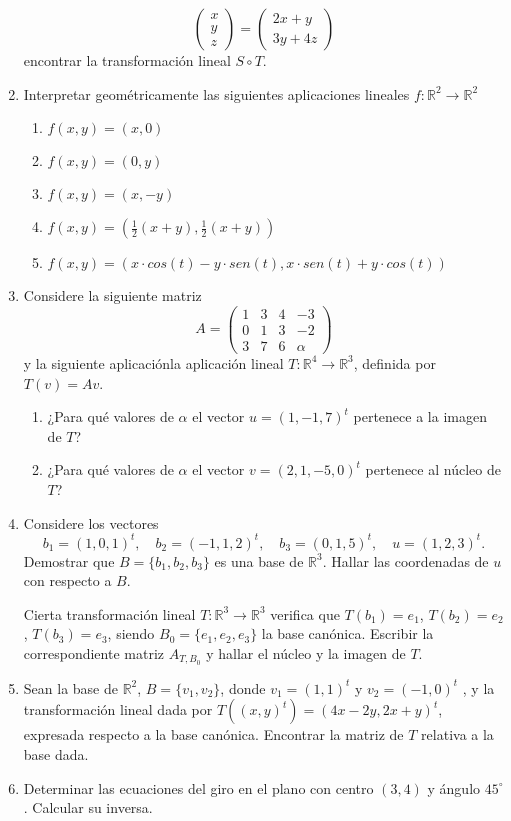 \documentclass[12pt,letterpaper]{article}
\begin{document}
\begin{enumerate}
$$\begin{pmatrix}
    x\\
    y\\
    z
  \end{pmatrix}=\begin{pmatrix}
    2x+y\\
    3y+4z
  \end{pmatrix}
  $$
  encontrar la transformación lineal $S \circ T$.
  \item Interpretar geométricamente las siguientes aplicaciones lineales $f : \mathbb{R}^2 \to \mathbb{R}^2$
    \begin{enumerate}
      \item $f (x, y) = (x, 0)$
      \item $f (x, y) = (0, y)$
      \item $f (x, y) = (x, -y)$
      \item $f (x, y) = ( \frac{1}{2}(x + y), \frac{1}{2}(x + y))$
      \item $f (x, y) = (x\cdot cos(t) - y\cdot sen(t) , x\cdot sen(t) + y\cdot cos(t))$
    \end{enumerate}
  \item Considere la siguiente matriz
    $$
    A=\begin{pmatrix}
      1 & 3 & 4 & -3\\
      0 & 1 & 3 & -2\\
      3 & 7 & 6 & \alpha
  \end{pmatrix}
  $$
  y la siguiente aplicaciónla aplicación lineal $T : \mathbb{R}^4\to\mathbb{R}^3$, definida por $T(v) = Av$.
  \begin{enumerate}
    \item ¿Para qué valores de $\alpha$ el vector $u = (1, -1, 7)^t$ pertenece a la imagen de $T$?
    \item ¿Para qué valores de $\alpha$ el vector $v = (2, 1, -5, 0)^t$ pertenece al núcleo de $T$?
  \end{enumerate}
  \item Considere los vectores
  $$
  b_1 = (1, 0, 1)^t,\quad b_2 = (-1, 1, 2)^t,\quad b_3 = (0, 1, 5)^t,\quad u = (1, 2, 3)^t .
  $$
  Demostrar que $B = \{b_1 , b_2 , b_3\}$ es una base de $\mathbb{R}^3$. Hallar las coordenadas de $u$ con respecto a $B$.
  
  Cierta transformación lineal $T : \mathbb{R}^3\to\mathbb{R}^3$ verifica que $T(b_1) = e_1$, $T(b_2) = e_2$, $T(b_3) = e_3$, siendo $B_0 = \{e_1 , e_2 , e_3 \}$ la base canónica. Escribir la correspondiente matriz $A_{T,B_0}$ y hallar el núcleo y la imagen de $T$.
  \item Sean la base de $\mathbb{R}^2$, $B = \{v_1 , v_2\}$, donde $v_1 = (1, 1)^t$ y $v_2 = (-1, 0)^t$ , y la transformación lineal dada por $T ((x, y)^t ) = (4x - 2y, 2x + y)^t$, expresada respecto a la base canónica. Encontrar la matriz de $T$ relativa a la base dada.
  \item Determinar las ecuaciones del giro en el plano con centro $(3, 4)$ y ángulo $45^\circ$. Calcular su inversa.
\end{enumerate}
\end{document}
